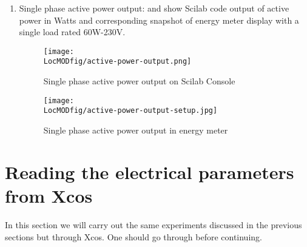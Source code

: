 \begin{enumerate}
  \item Single phase active power output:   and  show Scilab code output of active power
        in Watts and corresponding snapshot of energy meter display with a
        single load rated 60W-230V.        
        \begin{figure}
          \centering
          \texttt{[image: \\LocMODfig/active-power-output.png]}
          \caption{Single phase active power output on Scilab Console}
          \label{fig:power-console}
        \end{figure}
        
        \begin{figure}
          \centering
          \texttt{[image: \\LocMODfig/active-power-output-setup.jpg]}
          \caption{Single phase active power output in energy meter}
          \label{fig:power-meter}
        \end{figure}
        
\end{enumerate}


\section{Reading the electrical parameters from Xcos}
In this section we will carry out the same experiments discussed in
the previous sections but through Xcos. One should go through
 before continuing.

